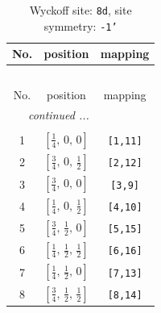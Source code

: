 \documentclass[fleqn,8pt]{jsarticle}
\begin{document}
\begin{longtable}{ccc}
\caption{Wyckoff site: {\tt 8d}, site symmetry: {\tt -1'}}
 \\
 \hline \hline
No. & position & mapping \\ \hline \endfirsthead

\multicolumn{2}{l}{\tablename\ \thetable{}} \\
 \hline \hline
No. & position & mapping \\ \hline \endhead

 \hline \hline
\multicolumn{2}{r}{\footnotesize\it continued ...} \\ \endfoot

 \hline \hline
\multicolumn{2}{r}{} \\ \endlastfoot

1 & $\left[ \frac{1}{4},\, 0,\, 0 \right]$ & {\tt [1,11]} \\ \hline
2 & $\left[ \frac{3}{4},\, 0,\, \frac{1}{2} \right]$ & {\tt [2,12]} \\ \hline
3 & $\left[ \frac{3}{4},\, 0,\, 0 \right]$ & {\tt [3,9]} \\ \hline
4 & $\left[ \frac{1}{4},\, 0,\, \frac{1}{2} \right]$ & {\tt [4,10]} \\ \hline
5 & $\left[ \frac{3}{4},\, \frac{1}{2},\, 0 \right]$ & {\tt [5,15]} \\ \hline
6 & $\left[ \frac{1}{4},\, \frac{1}{2},\, \frac{1}{2} \right]$ & {\tt [6,16]} \\ \hline
7 & $\left[ \frac{1}{4},\, \frac{1}{2},\, 0 \right]$ & {\tt [7,13]} \\ \hline
8 & $\left[ \frac{3}{4},\, \frac{1}{2},\, \frac{1}{2} \right]$ & {\tt [8,14]} \\
\end{longtable}
\renewcommand{\arraystretch}{1.2}
\end{document}
